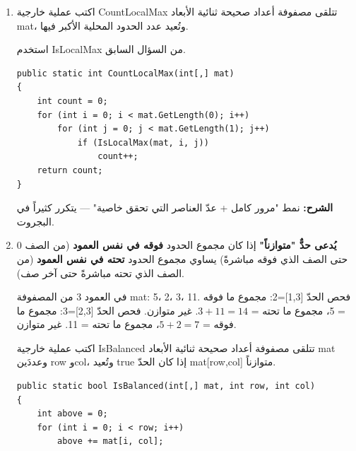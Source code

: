 \documentclass[14pt]{extarticle}
\begin{document}
\begin{enumerate}[itemsep=2em]
\item
اكتب عملية خارجية \textenglish{CountLocalMax} تتلقى مصفوفة أعداد صحيحة ثنائية الأبعاد \textenglish{mat}، وتُعيد عدد الحدود المحلية الأكبر فيها.

\begin{boxHint}
استخدم \textenglish{IsLocalMax} من السؤال السابق.
\end{boxHint}

\ifwithsols
\begin{boxSolution}
\begin{boxCode}
\begin{english}
\begin{verbatim}
public static int CountLocalMax(int[,] mat)
{
    int count = 0;
    for (int i = 0; i < mat.GetLength(0); i++)
        for (int j = 0; j < mat.GetLength(1); j++)
            if (IsLocalMax(mat, i, j))
                count++;
    return count;
}
\end{verbatim}
\end{english}
\end{boxCode}
\textbf{الشرح:} نمط "مرور كامل + عدّ العناصر التي تحقق خاصية" — يتكرر كثيراً في البجروت.
\end{boxSolution}
\fi

\clearpage
\item
\textbf{يُدعى حدٌّ "متوازناً"} إذا كان مجموع الحدود \textbf{فوقه في نفس العمود} (من الصف 0 حتى الصف الذي فوقه مباشرةً) يساوي مجموع الحدود \textbf{تحته في نفس العمود} (من الصف الذي تحته مباشرةً حتى آخر صف).

\begin{boxExample}
في العمود 3 من المصفوفة \textenglish{mat}: \textenglish{5، 2، 3، 11}.
فحص الحدّ \textenglish{[1,3]=2}: مجموع ما فوقه = \textenglish{5}، مجموع ما تحته = $3+11=14$. غير متوازن.
فحص الحدّ \textenglish{[2,3]=3}: مجموع ما فوقه = $5+2=7$، مجموع ما تحته = \textenglish{11}. غير متوازن.
\end{boxExample}

اكتب عملية خارجية \textenglish{IsBalanced} تتلقى مصفوفة أعداد صحيحة ثنائية الأبعاد \textenglish{mat} وعددَين \textenglish{row} و\textenglish{col}، وتُعيد \textenglish{true} إذا كان الحدّ \textenglish{mat[row,col]} متوازناً.

\ifwithsols
\begin{boxSolution}
\begin{boxCode}
\begin{english}
\begin{verbatim}
public static bool IsBalanced(int[,] mat, int row, int col)
{
    int above = 0;
    for (int i = 0; i < row; i++)
        above += mat[i, col];


\end{verbatim}
\end{english}
\end{boxCode}
\end{boxSolution}
\end{enumerate}
\end{document}
